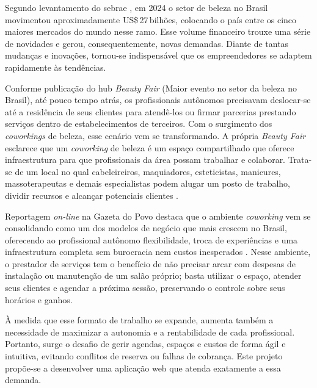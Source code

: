 
Segundo levantamento do \gls{sebrae} \cite{Sebrae_2024}
, em 2024 o setor de beleza no Brasil movimentou aproximadamente US\$\,27\,bilhões, colocando o país entre os cinco maiores mercados do mundo nesse ramo. Esse volume financeiro trouxe uma série de novidades e gerou, consequentemente, novas demandas. Diante de tantas mudanças e inovações, tornou-se indispensável que os empreendedores se adaptem rapidamente às tendências.

Conforme publicação do hub \emph{Beauty Fair} (Maior evento no setor da beleza no Brasil), até pouco tempo atrás, os profissionais autônomos precisavam deslocar-se até a residência de seus clientes para atendê-los ou firmar parcerias prestando serviços dentro de estabelecimentos de terceiros. Com o surgimento dos \emph{coworkings} de beleza, esse cenário vem se transformando. A própria \emph{Beauty Fair} esclarece que um \emph{coworking} de beleza é um espaço compartilhado que oferece infraestrutura para que profissionais da área possam trabalhar e colaborar. Trata-se de um local no qual cabeleireiros, maquiadores, esteticistas, manicures, massoterapeutas e demais especialistas podem alugar um posto de trabalho, dividir recursos e alcançar potenciais clientes \cite{BeautyFair}.

Reportagem \emph{on-line} na Gazeta do Povo destaca que o ambiente \emph{coworking} vem se consolidando como um dos modelos de negócio que mais crescem no Brasil, oferecendo ao profissional autônomo flexibilidade, troca de experiências e uma infraestrutura completa sem burocracia nem custos inesperados \cite{gazeta-coworking}. Nesse ambiente, o prestador de serviços tem o benefício de não precisar arcar com despesas de instalação ou manutenção de um salão próprio; basta utilizar o espaço, atender seus clientes e agendar a próxima sessão, preservando o controle sobre seus horários e ganhos.

À medida que esse formato de trabalho se expande, aumenta também a necessidade de maximizar a autonomia e a rentabilidade de cada profissional. Portanto, surge o desafio de gerir agendas, espaços e custos de forma ágil e intuitiva, evitando conflitos de reserva ou falhas de cobrança. Este projeto propõe-se a desenvolver uma aplicação web que atenda exatamente a essa demanda.





